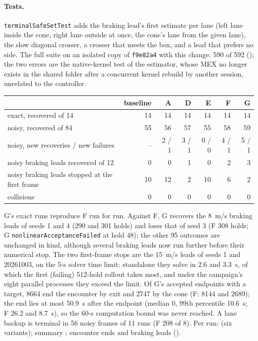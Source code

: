 \documentclass[11pt]{article}
\begin{document}
\paragraph{Tests.} \texttt{terminalSafeSetTest} adds the braking lead's
first estimate per lane (left lane inside the cone, right lane outside at
once, the cone's lane from the given lane), the slow diagonal crosser, a
crosser that meets the box, and a lead that prefers no side. The full suite
on an isolated copy of \texttt{f9e82a4} with this change: 590 of 592
(); the two errors are the native-kernel test of the
estimator, whose MEX no longer exists in the shared  folder
after a concurrent kernel rebuild by another session, unrelated to the
controller.

\begin{center}
\begin{tabular}{lrrrrrr}
\toprule
 & baseline & A & D & E & F & G\\
\midrule
exact, recovered of 14 & 14 & 14 & 14 & 14 & 14 & 14\\
noisy, recovered of 84 & 55 & 56 & 57 & 55 & 58 & 59\\
noisy, new recoveries / new failures & -- & 2 / 1 & 3 / 1 & 0 / 0 & 4 / 1 & 5 / 1\\
noisy braking leads recovered of 12 & 0 & 0 & 1 & 0 & 2 & 3\\
noisy braking leads stopped at the first frame & 10 & 12 & 2 & 10 & 6 & 2\\
collisions & 0 & 0 & 0 & 0 & 0 & 0\\
\bottomrule
\end{tabular}
\end{center}
G's exact runs reproduce F run for run. Against F, G recovers the 8~m/s
braking leads of seeds 1 and 4 (290 and 301 holds) and loses that of seed 3
(F 308 holds; G \texttt{nonlinearAcceptanceFailed} at hold 48); the other 95
outcomes are unchanged in kind, although several braking leads now run
further before their numerical stop. The two first-frame stops are the 15~m/s
leads of seeds 1 and 20261003, on the 5-s solver time limit: standalone they
solve in 2.6 and 3.3~s, of which the first (failing) 512-hold rollout takes
most, and under the campaign's eight parallel processes they exceed the
limit. Of G's accepted endpoints with a target, 8664 end the encounter by
exit and 2747 by the cone (F: 8144 and 2689); the end lies at most 50.9~s
after the endpoint (median 0, 99th percentile 10.6~s; F 26.2 and 8.7~s), so
the 60-s computation bound was never reached. A lane backup is terminal in
56 noisy frames of 11 runs (F 208 of 8). Per run: 
(six variants); summary ; encounter ends and
braking leads  ().
\end{document}
